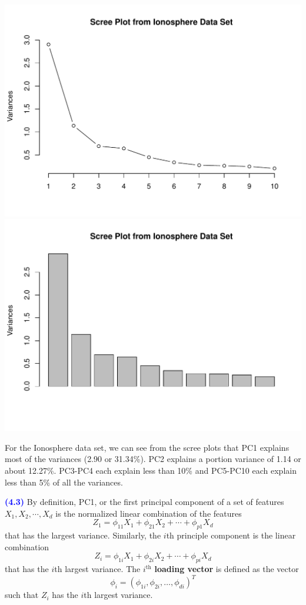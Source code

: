 \documentclass[a4paper,12pt]{article}
\newcommand{\qnum}[1]{\noindent\textcolor{blue}{\textbf{(#1)}}}
\begin{document}
\begin{center}
  \includegraphics[width=0.7\linewidth]{Image/Prob4-2-Ionosphere1.pdf}
  \includegraphics[width=0.7\linewidth]{Image/Prob4-2-Ionosphere2.pdf}
\end{center}
For the Ionosphere data set, we can see from the scree plots that PC1 explains most of the variances (2.90 or 31.34\%). 
PC2 explains a portion variance of 1.14 or about 12.27\%. PC3-PC4 each explain less than 10\% and PC5-PC10 each explain less than 5\% of all the variances.
\bigskip\bigskip






\qnum{4.3}
By definition, PC1, or the first principal component of a set of features $X_1, X_2, \cdots, X_d$ is the normalized linear combination of the features
\[
    Z_1 = \phi_{11}X_1 + \phi_{21}X_2 + \cdots + \phi_{p1}X_d
\]
that has the largest variance. Similarly, the $i$th principle component is the linear combination
\[
    Z_i = \phi_{1i}X_1 + \phi_{2i}X_2 + \cdots + \phi_{pi}X_d
\]
that has the $i$th largest variance. 
The $i^\text{th}$ \textbf{loading vector} is defined as the vector
\[
    \phi_i = (\phi_{1i}, \phi_{2i},\dots, \phi_{di})^T
\]
such that $Z_i$ has the $i$th largest variance. 
\end{document}
